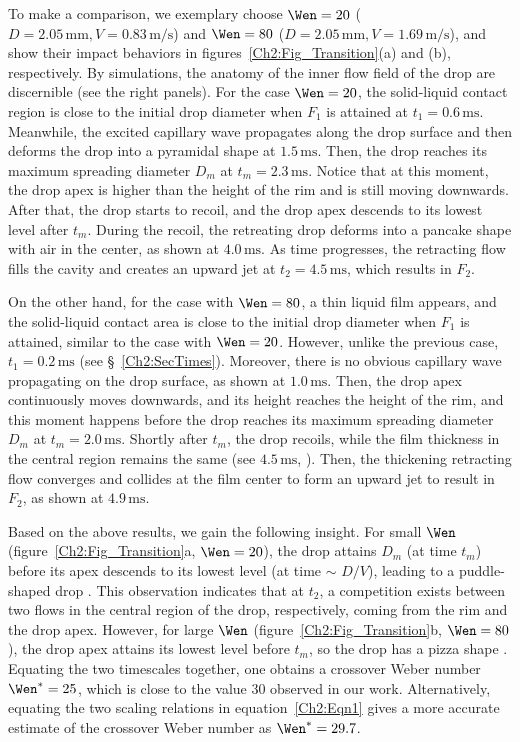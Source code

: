 \begin{subappendices}
	To make a comparison, we exemplary choose $\Wen = 20$ ($D = 2.05\,\si{\milli\meter}, V = 0.83\,\si{\meter}/\si{\second}$) and $\Wen = 80$ ($D = 2.05\,\si{\milli\meter}, V = 1.69\,\si{\meter}/\si{\second}$), and show their impact behaviors in figures~\ref{Ch2:Fig_Transition}(a) and (b), respectively. By simulations, the anatomy of the inner flow field of the drop are discernible (see the right panels). For the case $\Wen = 20$, the solid-liquid contact region is close to the initial drop diameter when $F_1$ is attained at $t_1 = 0.6\,\si{\milli\second}$. Meanwhile, the excited capillary wave propagates along the drop surface and then deforms the drop into a pyramidal shape at $1.5\,\si{\milli\second}$. Then, the drop reaches its maximum spreading diameter $D_m$ at $t_m = 2.3\,\si{\milli\second}$. Notice that at this moment, the drop apex is higher than the height of the rim and is still moving downwards. After that, the drop starts to recoil, and the drop apex descends to its lowest level after $t_m$. During the recoil, the retreating drop deforms into a pancake shape with air in the center, as shown at $4.0\,\si{\milli\second}$. As time progresses, the retracting flow fills the cavity and creates an upward jet at $t_2 = 4.5\,\si{\milli\second}$, which results in $F_2$.
	
	On the other hand, for the case with $\Wen = 80$, a thin liquid film appears, and the solid-liquid contact area is close to the initial drop diameter when $F_1$ is attained, similar to the case with $\Wen = 20$. However, unlike the previous case, $t_1 = 0.2\,\si{\milli\second}$ (see \S~\ref{Ch2:SecTimes}). Moreover, there is no obvious capillary wave propagating on the drop surface, as shown at $1.0\,\si{\milli\second}$. Then, the drop apex continuously moves downwards, and its height reaches the height of the rim, and this moment happens before the drop reaches its maximum spreading diameter $D_m$ at $t_m = 2.0\,\si{\milli\second}$. Shortly after $t_m$, the drop recoils, while the film thickness in the central region remains the same (see $4.5\,\si{\milli\second}$, \cite{eggers2010drop}). Then, the thickening retracting flow converges and collides at the film center to form an upward jet to result in $F_2$, as shown at $4.9\,\si{\milli\second}$.
	
	Based on the above results, we gain the following insight. For small $\Wen$ (figure~\ref{Ch2:Fig_Transition}a, $\Wen = 20$), the drop attains $D_{m}$ (at time $t_m$) before its apex descends to its lowest level (at time $\sim$ $D/V$), leading to a puddle-shaped drop \cite{wildeman2016spreading}. This observation indicates that at $t_2$, a competition exists between two flows in the central region of the drop, respectively, coming from the rim and the drop apex. However, for large $\Wen$ (figure~\ref{Ch2:Fig_Transition}b, $\Wen = 80$), the drop apex attains its lowest level before $t_m$, so the drop has a pizza shape \cite{eggers2010drop, wildeman2016spreading}. Equating the two timescales together, one obtains a crossover Weber number $\Wen^* = 25$, which is close to the value $30$ observed in our work. Alternatively, equating the two scaling relations in equation~\eqref{Ch2:Eqn1} gives a more accurate estimate of the crossover Weber number as $\Wen^* = 29.7$.
	

\end{subappendices}
